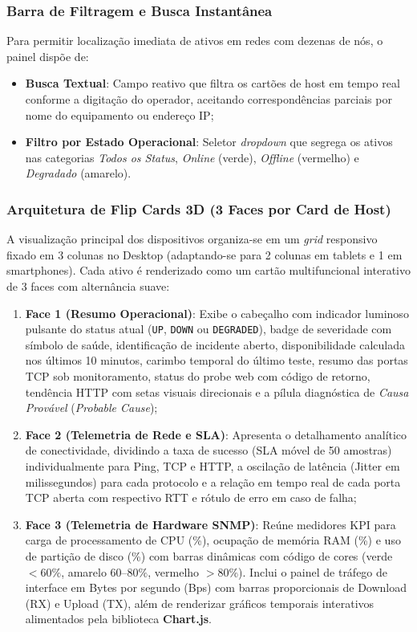 \documentclass[12pt,a4paper]{article}
\begin{document}
\subsubsection{Barra de Filtragem e Busca Instantânea}
Para permitir localização imediata de ativos em redes com dezenas de nós, o painel dispõe de:
\begin{itemize}[leftmargin=1.25cm]
\item \textbf{Busca Textual}: Campo reativo que filtra os cartões de host em tempo real conforme a digitação do operador, aceitando correspondências parciais por nome do equipamento ou endereço IP;
\item \textbf{Filtro por Estado Operacional}: Seletor \textit{dropdown} que segrega os ativos nas categorias \textit{Todos os Status}, \textit{Online} (verde), \textit{Offline} (vermelho) e \textit{Degradado} (amarelo).
\end{itemize}

\subsubsection{Arquitetura de Flip Cards 3D (3 Faces por Card de Host)}
A visualização principal dos dispositivos organiza-se em um \textit{grid} responsivo fixado em 3 colunas no Desktop (adaptando-se para 2 colunas em tablets e 1 em smartphones). Cada ativo é renderizado como um cartão multifuncional interativo de 3 faces com alternância suave:

\begin{enumerate}[leftmargin=1.25cm]
\item \textbf{Face 1 (Resumo Operacional)}: Exibe o cabeçalho com indicador luminoso pulsante do status atual (\texttt{UP}, \texttt{DOWN} ou \texttt{DEGRADED}), badge de severidade com símbolo de saúde, identificação de incidente aberto, disponibilidade calculada nos últimos 10 minutos, carimbo temporal do último teste, resumo das portas TCP sob monitoramento, status do probe web com código de retorno, tendência HTTP com setas visuais direcionais e a pílula diagnóstica de \textit{Causa Provável} (\textit{Probable Cause});
\item \textbf{Face 2 (Telemetria de Rede e SLA)}: Apresenta o detalhamento analítico de conectividade, dividindo a taxa de sucesso (SLA móvel de 50 amostras) individualmente para Ping, TCP e HTTP, a oscilação de latência (Jitter em milissegundos) para cada protocolo e a relação em tempo real de cada porta TCP aberta com respectivo RTT e rótulo de erro em caso de falha;
\item \textbf{Face 3 (Telemetria de Hardware SNMP)}: Reúne medidores KPI para carga de processamento de CPU (\%), ocupação de memória RAM (\%) e uso de partição de disco (\%) com barras dinâmicas com código de cores (verde $<60\%$, amarelo $60\text{--}80\%$, vermelho $>80\%$). Inclui o painel de tráfego de interface em Bytes por segundo (Bps) com barras proporcionais de Download (RX) e Upload (TX), além de renderizar gráficos temporais interativos alimentados pela biblioteca \textbf{Chart.js}.
\end{enumerate}
\end{document}
